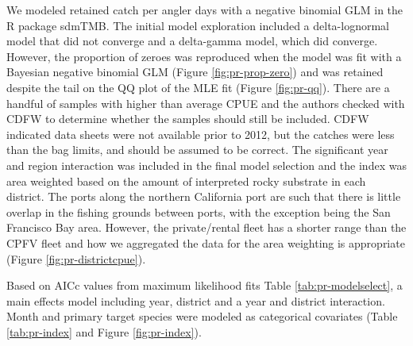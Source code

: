 \documentclass[11pt,
  english,
  letterpaper,
]{article}
\begin{document}
We modeled retained catch per angler days with a negative binomial GLM in the R package sdmTMB. The initial model exploration included a delta-lognormal model that did not converge and a delta-gamma model, which did converge. However, the proportion of zeroes was reproduced when the model was fit with a Bayesian negative binomial GLM (Figure \ref{fig:pr-prop-zero}) and was retained despite the tail on the QQ plot of the MLE fit (Figure \ref{fig:pr-qq}). There are a handful of samples with higher than average CPUE and the authors checked with CDFW to determine whether the samples should still be included. CDFW indicated data sheets were not available prior to 2012, but the catches were less than the bag limits, and should be assumed to be correct. The significant year and region interaction was included in the final model selection and the index was area weighted based on the amount of interpreted rocky substrate in each district. The ports along the northern California port are such that there is little overlap in the fishing grounds between ports, with the exception being the San Francisco Bay area. However, the private/rental fleet has a shorter range than the CPFV fleet and how we aggregated the data for the area weighting is appropriate (Figure \ref{fig:pr-districtcpue}).

Based on AICc values from maximum likelihood fits Table \ref{tab:pr-modelselect}, a main effects model including year, district and a year and district interaction. Month and primary target species were modeled as categorical covariates (Table \ref{tab:pr-index} and Figure \ref{fig:pr-index}).

\newpage

\begingroup\fontsize{10}{12}\selectfont
\begingroup\fontsize{10}{12}\selectfont
\end{document}
